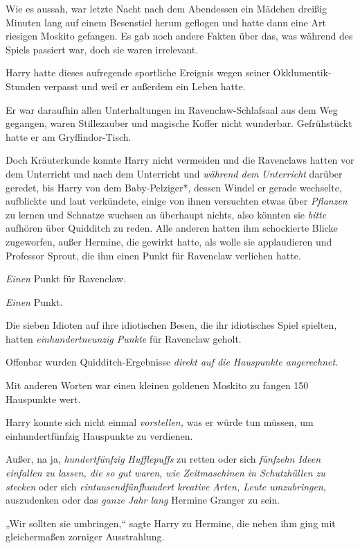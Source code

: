 {Wie es aussah, war letzte Nacht nach dem Abendessen ein Mädchen dreißig Minuten lang auf einem Besenstiel herum geflogen und hatte dann eine Art riesigen Moskito gefangen. Es gab noch andere Fakten über das, was während des Spiels passiert war, doch sie waren irrelevant.

Harry hatte dieses aufregende sportliche Ereignis wegen seiner Okklumentik-Stunden verpasst und weil er außerdem ein Leben hatte.

Er war daraufhin allen Unterhaltungen im Ravenclaw-Schlafsaal aus dem Weg gegangen, waren Stillezauber und magische Koffer nicht wunderbar. Gefrühstückt hatte er am Gryffindor-Tisch.

Doch Kräuterkunde konnte Harry nicht vermeiden und die Ravenclaws hatten vor dem Unterricht und nach dem Unterricht und \emph{während dem} \emph{Unterricht} darüber geredet, bis Harry von dem Baby-Pelziger*, dessen Windel er gerade wechselte, aufblickte und laut verkündete, einige von ihnen versuchten etwas über \emph{Pflanzen} zu lernen und Schnatze wuchsen an überhaupt nichts, also könnten sie \emph{bitte} aufhören über Quidditch zu reden. Alle anderen hatten ihm schockierte Blicke zugeworfen, außer Hermine, die gewirkt hatte, als wolle sie applaudieren und Professor Sprout, die ihm einen Punkt für Ravenclaw verliehen hatte.

\emph{Einen} Punkt für Ravenclaw.

\emph{Einen} Punkt.

Die sieben Idioten auf ihre idiotischen Besen, die ihr idiotisches Spiel spielten, hatten \emph{einhundertneunzig Punkte} für Ravenclaw geholt.

Offenbar wurden Quidditch-Ergebnisse \emph{direkt auf die Hauspunkte angerechnet.}

Mit anderen Worten war einen kleinen goldenen Moskito zu fangen 150 Hauspunkte wert.

Harry konnte sich nicht einmal \emph{vorstellen,} was er würde tun müssen, um einhundertfünfzig Hauspunkte zu verdienen.

Außer, na ja, \emph{hundertfünfzig Hufflepuffs} zu retten oder sich \emph{fünfzehn Ideen einfallen zu lassen, die so gut waren, wie Zeitmaschinen in Schutzhüllen zu stecken} oder sich \emph{eintausendfünfhundert kreative Arten, Leute umzubringen}, auszudenken oder das \emph{ganze Jahr lang} Hermine Granger zu sein.

„Wir sollten sie umbringen,“ sagte Harry zu Hermine, die neben ihm ging mit gleichermaßen zorniger Ausstrahlung.

}
